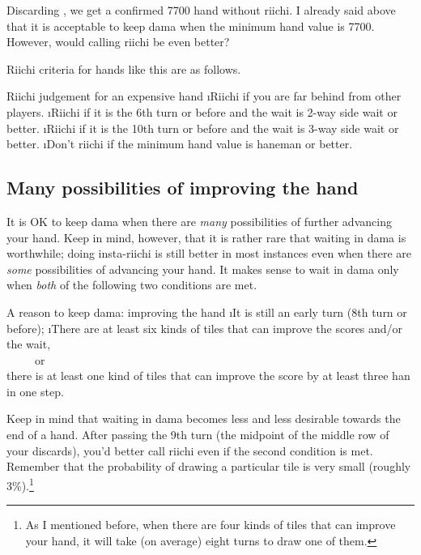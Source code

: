 \bigskip Discarding {\LARGE{}}, we get a confirmed 7700 hand without riichi. I already said above that it is acceptable to keep {\jap dama} when the minimum hand value is 7700. However, would calling riichi be even better? 

\bigskip
Riichi criteria for hands like this are as follows.

\bigskip
\begin{itembox}[c]{Riichi judgement for an expensive hand}
\bi
\i Riichi if you are far behind from other players.
\i Riichi if it is the 6th turn or before and the wait is 2-way side wait or better.
\i Riichi if it is the 10th turn or before and the wait is 3-way side wait or better.
\i Don't riichi if the minimum hand value is {\jap haneman} or better.
\ei
\vsps
\end{itembox}

\bigskip
\subsection{Many possibilities of improving the hand} \label{sec:imp}
It is OK to keep {\jap dama} when there are \emph{many} possibilities of further advancing your hand. Keep in mind, however, that it is rather rare that waiting in {\jap dama} is worthwhile; doing insta-riichi is still better in most instances even when there are \emph{some} possibilities of advancing your hand. It makes sense to wait in {\jap dama} only when \emph{both} of the following two conditions are met. 

\bigskip
\begin{itembox}[c]{A reason to keep {\jap dama}: improving the hand}
\bi
\i It is still an early turn (8th turn or before);
\i There are at least six kinds of tiles that can improve the scores and/or the wait, \\~~~~~or\\
there is at least one kind of tiles that can improve the score by at least three {\jap han} in one step.
\ei
\end{itembox}

\bigskip
Keep in mind that waiting in {\jap dama} becomes less and less desirable towards the end of a hand. After passing the 9th turn (the midpoint of the middle row of your discards), you'd better call riichi even if the second condition is met. Remember that the probability of drawing a particular tile is very small (roughly 3\%).\footnote{As I mentioned before, when there are four kinds of tiles that can improve your hand, it will take (on average) eight turns to draw one of them.}


